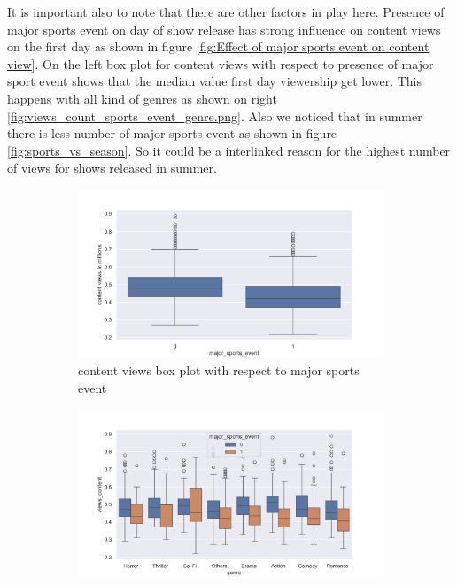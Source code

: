 \documentclass[12pt,a4paper]{style}
\begin{document}
It is important also to note that there are other factors in play here. Presence of major sports event on day of show release has strong influence on content views on the first day as shown in figure \ref{fig:Effect of major sports event on content view}. On the left  box plot for content views with respect to presence of major sport event shows that the median value first day viewership get lower. This happens with all kind of genres as shown on right \ref{fig:views_count_sports_event_genre.png}. Also we noticed that in summer there is less number of major sports event as shown in figure \ref{fig:sports_vs_season}. So it could be a interlinked reason for the highest number of views for shows released in summer.      
\begin{figure}[h]
	\centering
	\begin{subfigure}[t]{0.49\textwidth}
		\includegraphics[width=\textwidth]{major_sports_event_vs_content_views.png}
		\caption{content views box plot with respect to major sports event}
		\label{fig:major_sports_event_vs_content_views.png}
	\end{subfigure}
	\hfill
	\begin{subfigure}[t]{0.49\textwidth}
		\includegraphics[width=\textwidth]{views_count_sports_event_genre.png}

\end{subfigure}
\end{figure}
\end{document}
